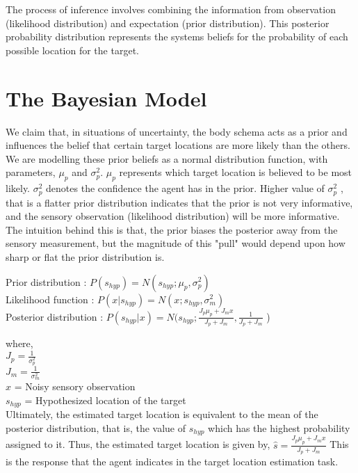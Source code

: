 The process of inference involves combining the information from observation (likelihood distribution) and expectation (prior distribution). This posterior probability distribution represents the systems beliefs for the probability of each possible location for the target.   


\section{The Bayesian Model}

We claim that, in situations of uncertainty, the body schema acts as a prior and influences the belief that certain target locations are more likely than the others. We are modelling these prior beliefs as a normal distribution function, with parameters, $\mu_p$ and $\sigma_p^2$. $\mu_p$ represents which target location is believed to be most likely. $\sigma_p^2$ denotes the confidence the agent has in the prior. Higher value of  $\sigma_p^2$ , that is a flatter prior distribution indicates that the prior is not very informative, and the sensory observation (likelihood distribution) will be more informative. The intuition behind this is that, the prior biases the posterior away from the sensory measurement, but the magnitude of this "pull" would depend upon how sharp or flat the prior distribution is. 



Prior distribution : $ P(s_{hyp}) = N(s_{hyp};  \mu_p,  \sigma_p^2) $ \\
Likelihood function : $ P(x|s_{hyp}) = N(x;  s_{hyp},  \sigma_m^2) $ \\
Posterior distribution : $ P(s_{hyp} | x) = N ( s_{hyp};  \frac{J_p \mu_p + J_m x}{J_p + J_m} ,  \frac{1}{J_p + J_m}$ ) 

where, \\
$ J_p = \frac{1}{\sigma_p^2}$ \\
$ J_m = \frac{1}{\sigma_m^2}$ \\
$x$ = Noisy sensory observation \\
$s_{hyp}$ = Hypothesized location of the target \\


Ultimately, the estimated target location is equivalent to the mean of the posterior distribution, that is, the value of $s_{hyp}$ which has the highest probability assigned to it. Thus, the estimated target location is given by,
$\hat{s} = \frac{J_p \mu_p + J_m x}{J_p + J_m} $ 
This is the response that the agent indicates in the target location estimation task.

